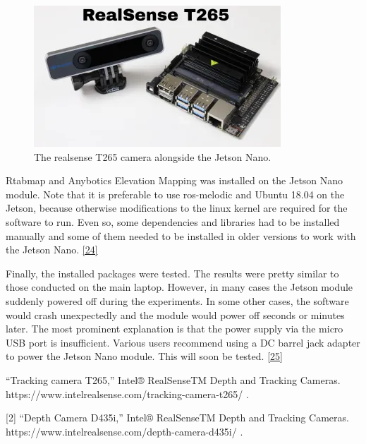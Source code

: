 \documentclass{article}
\begin{document}
\begin{figure}[h] %
    \centering
	\includegraphics[width=\textwidth,height=\textheight,keepaspectratio]{report1-img022.png} %
	\caption{The realsense T265 camera alongside the Jetson Nano. }
\end{figure}


Rtabmap and Anybotics Elevation Mapping was installed on the Jetson Nano module. Note that it is preferable to use ros-melodic and Ubuntu 18.04 on the Jetson, because otherwise modifications to the linux kernel are required for the software to run. Even so, some dependencies and libraries had to be installed manually and some of them needed to be installed in older versions to work with the Jetson Nano. \href{https://github.com/JetsonHacksNano/installROS}{[24]}

Finally, the installed packages were tested. The results were pretty similar to those conducted on the main laptop. However, in many cases the Jetson module suddenly powered off during the experiments. In some other cases, the software would crash unexpectedly and the module would power off seconds or minutes later. The most prominent explanation is that the power supply via the micro USB port is insufficient. Various users recommend using a DC barrel jack adapter to power the Jetson Nano module. This will soon be tested. \href{https://desertbot.io/blog/jetson-nano-power-supply-barrel-vs-micro-usb}{[25]}

\newpage
[1]	“Tracking camera T265,” Intel® RealSenseTM Depth and Tracking Cameras. https://www.intelrealsense.com/tracking-camera-t265/ .
\bigskip

[2]	“Depth Camera D435i,” Intel® RealSenseTM Depth and Tracking Cameras. https://www.intelrealsense.com/depth-camera-d435i/ .
\bigskip
\end{document}
